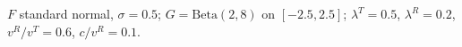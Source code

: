 $F$ standard normal, $\sigma=0.5$; $G=\mathrm{Beta}(2,8)$ on $[-2.5,2.5]$; $\lambda^T=0.5$, $\lambda^R=0.2$, $v^R/v^T=0.6$, $c/v^R=0.1$.%